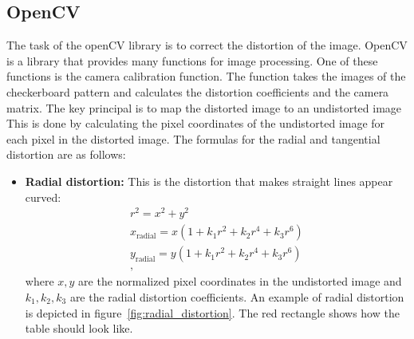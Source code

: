 \subsection{OpenCV}\label{subsec:opencv}
The task of the openCV library is to correct the distortion of the image.
OpenCV is a library that provides many functions for image processing.
One of these functions is the camera calibration function.
The function takes the images of the checkerboard pattern and calculates the distortion coefficients and the camera matrix.
The key principal is to map the distorted image to an undistorted image
This is done by calculating the pixel coordinates of the undistorted image for each pixel in the distorted image.
The formulas for the radial and tangential distortion are as follows:\autocite{opencv-undistort}
\begin{itemize}
    \item \textbf{Radial distortion:} This is the distortion that makes straight lines appear curved:
    \begin{gather*}
        r^2 = x^2 + y^2\\
        x_{\text{radial}} = x(1 + k_1 r^2 + k_2 r^4 + k_3 r^6)\\
        y_{\text{radial}} = y(1 + k_1 r^2 + k_2 r^4 + k_3 r^6)\\,
    \end{gather*}
    where \(x,y\) are the normalized pixel coordinates in the undistorted image and \( k_1, k_2, k_3 \) are the radial distortion coefficients.
    An example of radial distortion is depicted in figure~\ref{fig:radial_distortion}.
    The red rectangle shows how the table should look like.
    \begin{figure}[H]
        \centering
\end{figure}
\end{itemize}
